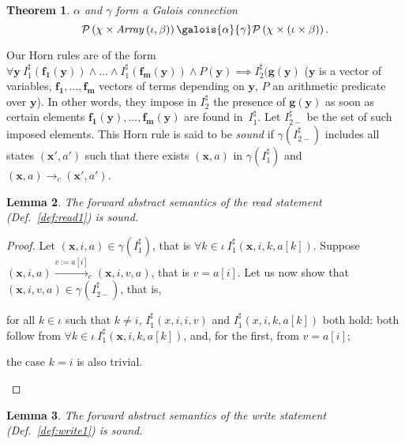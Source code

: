 \documentclass[a4paper]{article}
\newcommand{\ve}[1]{\mathbf{#1}}
\newcommand{\vx}{\ve{x}}
\newcommand{\arraytype}[2]{\mathit{Array}\left(#1,#2\right)}
\newcommand{\abstr}[1]{#1^\sharp}
\newcommand{\parts}[1]{\mathcal{P}\left(#1\right)}
\newcommand{\concretization}[2][]{\gamma_{#1}\left(#2\right)}
\theoremstyle{definition}
\theoremstyle{plain}
\newtheorem{theorem}{Theorem}
\newtheorem{lemma}[theorem]{Lemma}
\begin{document}
\begin{theorem}
$\alpha$ and $\gamma$ form a Galois connection
\begin{equation*}
 \parts{\chi \times \arraytype{\iota}{\beta}}
 \galois{\alpha}{\gamma} \parts{\chi \times (\iota \times \beta)}.
\end{equation*}
\end{theorem}

Our Horn rules are of the form $\forall \ve{y}~ \abstr{I_1}(\ve{f_1}(\ve{y})) \land \dots \land \abstr{I_1}(\ve{f_m}(\ve{y})) \land P(\ve{y}) \implies \abstr{I}_2(\ve{g}(\ve{y})$ ($\ve{y}$ is a vector of variables, $\ve{f_1},\dots,\ve{f_m}$ vectors of terms depending on $\ve{y}$, $P$ an arithmetic predicate over $\ve{y}$).
In other words, they impose in $\abstr{I}_2$ the presence of $\ve{g}(\ve{y})$ as soon as certain elements $\ve{f_1}(\ve{y}),\dots,\ve{f_m}(\ve{y})$ are found in~$\abstr{I_1}$.
Let $\abstr{I}_{2-}$ be the set of such imposed elements.
This Horn rule is said to be \emph{sound} if $\gamma(\abstr{I}_{2-})$ includes all states $(\vx',a')$ such that there exists $(\vx,a)$ in $\gamma(\abstr{I}_1)$ and $(\vx,a) \rightarrow_c (\vx',a')$.




\begin{lemma}
The forward abstract semantics of the read statement (Def.~\ref{def:read1}) is sound.
\end{lemma}

\begin{proof}
Let $(\vx,i,a) \in \gamma(\abstr{I}_1)$, that is
$\forall k \in \iota~ \abstr{I}_1(\vx,i,k,a[k])$.
Suppose $(\vx,i,a) \xrightarrow{v:=a[i]}_c (\vx,i,v,a)$, that is $v=a[i]$.
Let us now show that $(\vx,i,v,a) \in \concretization{\abstr{I}_{2-}}$, that is,
\begin{inparaenum}[i)]
\item for all $k \in \iota$ such that $k \neq i$, $\abstr{I}_1(x,i,i,v)$ and $\abstr{I}_1(x,i,k,a[k])$ both hold: both follow from $\forall k \in \iota~ \abstr{I}_1(\vx,i,k,a[k])$, and, for the first, from $v=a[i]$;
\item the case $k = i$ is also trivial.
\end{inparaenum}
\end{proof}


\begin{lemma}
The forward abstract semantics of the write statement (Def.~\ref{def:write1}) is sound.
\end{lemma}
\end{document}
